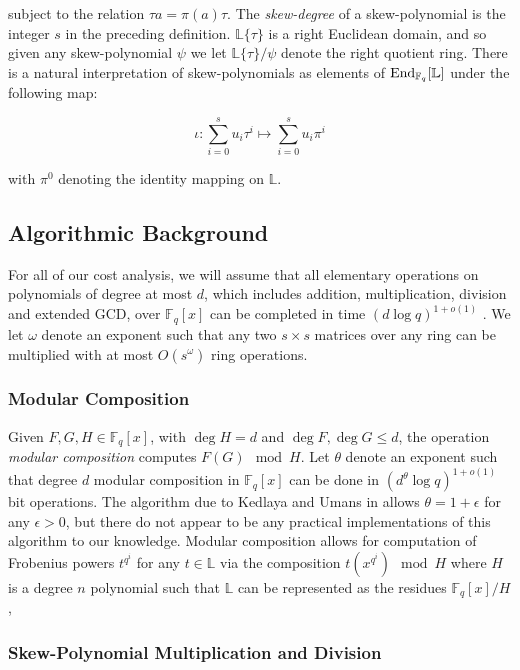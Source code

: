 \documentclass[sigconf]{acmart}
\newcommand{\F}{\mathbb{F}}
\renewcommand{\L}{\mathbb{L}}
\begin{document}
subject to the relation $\tau a = \pi(a) \tau$. The \textit{skew-degree} of a skew-polynomial is the integer $s$ in the preceding definition. $\L\{\tau\}$ is a right Euclidean domain, and so given any skew-polynomial $\psi$ we let $\L\{ \tau \}/\psi$ denote the right quotient ring. 
There is a natural interpretation of skew-polynomials as elements of $\textnormal{End}_{\F_q}[\L]$ under the following map:

\begin{equation*}
    \iota : \sum_{i=0}^su_i\tau^i \mapsto \sum_{i=0}^su_i\pi^i 
\end{equation*}

with $\pi^0$ denoting the identity mapping on $\L$.

\subsection{Algorithmic Background}

For all of our cost analysis, we will assume that all elementary operations on polynomials of degree at most $d$, which includes addition, multiplication, division and extended GCD, over $\F_q[x]$ can be completed in time $(d \log q)^{1 + o(1)}$ \cite{vonzurgathen_gerhard_2013}. We let $\omega$ denote an exponent such that any two $s\times s$ matrices over any ring can be multiplied with at most $O(s^{\omega})$ ring operations. 

\subsubsection{Modular Composition} 
Given $F,G,H \in \F_q[x]$, with $\deg H = d$ and $\deg F, \deg G \leq d$, the operation \textit{modular composition} computes $F(G) \mod H$. Let $\theta$ denote an exponent such that degree $d$ modular composition in $\F_q[x]$ can be done in $(d^{\theta} \log q)^{1 + o(1)}$ bit operations. The algorithm due to Kedlaya and Umans in \cite{kedlaya_umans} allows $\theta = 1 + \epsilon$ for any $\epsilon > 0$, but there do not appear to be any practical implementations of this algorithm to our knowledge. Modular composition allows for computation of Frobenius powers $t^{q^i}$ for any $t \in \L$ via the composition $t(x^{q^i}) \mod H$ where $H$ is a degree $n$ polynomial such that $\L$ can be represented as the residues $\F_q[x]/H$, 

\subsubsection{Skew-Polynomial Multiplication and Division} 
\end{document}

